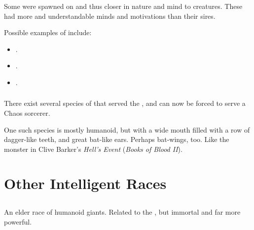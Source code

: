 Some \theratons were spawned on \Miith and thus closer in nature and mind to \Miithian creatures. 
These had more \human and understandable minds and motivations than their \xsic sires. 

Possible examples of \theratons include:
\begin{itemize}
  \item \HothNrul. 
  \item \Ubloth. 
  \item \Yolbaoth. 
\end{itemize}










\subsection{\XzaiShannic \pdaemons}
There exist several species of \pdaemons{} that served the \xzaishanns, and can now be forced to serve a Chaos sorcerer. 

One such species is mostly humanoid, but with a wide mouth filled with a row of dagger-like teeth, and great bat-like ears. 
Perhaps bat-wings, too. 
Like the monster in Clive Barker's \emph{Hell's Event} (\emph{Books of Blood II}). 























\chapter{Other Intelligent Races}















\section{\Aryoth}
\index{\aryoth}
An elder race of humanoid giants. 
Related to the \nephilim, but immortal and far more powerful. 



